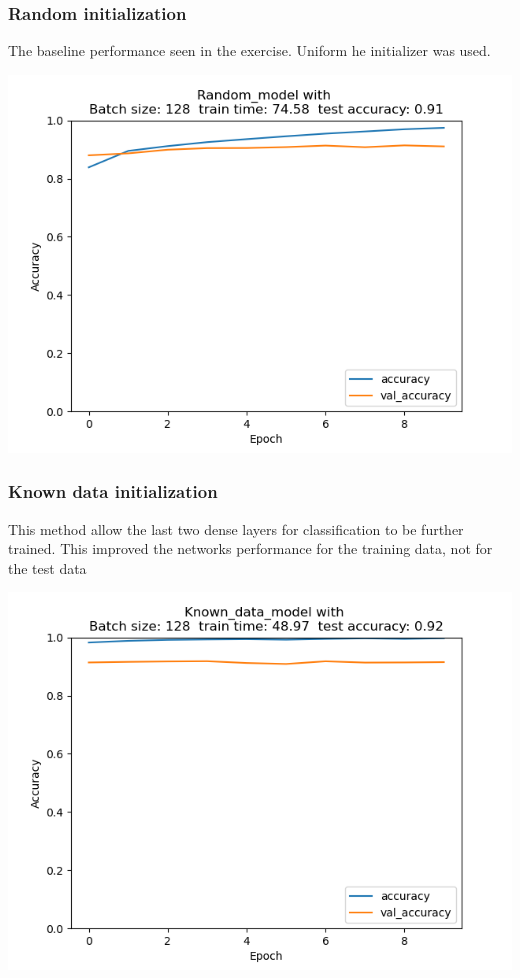\documentclass{article}
\newenvironment{Figure}
{\par\medskip\noindent\minipage{\linewidth}}
{\endminipage\par\medskip}
\begin{document}
\begin{multicols}{2}
\subsubsection{Random initialization}
The baseline performance seen in the exercise. Uniform he initializer was used.
\begin{Figure}
	\label{fig:random_init}
	\centering
	\includegraphics[width=\linewidth]{../img_1_1_init/acc_plot_Random_model}
\end{Figure}

\subsubsection{Known data initialization}
This method allow the last two dense layers for classification to be further trained. This improved the networks performance for the training data, not for the test data
\begin{Figure}
	\label{fig:known_init}
	\centering
	\includegraphics[width=\linewidth]{../img_1_1_init/acc_plot_Known_data_model}
\end{Figure}


\end{multicols}
\end{document}
